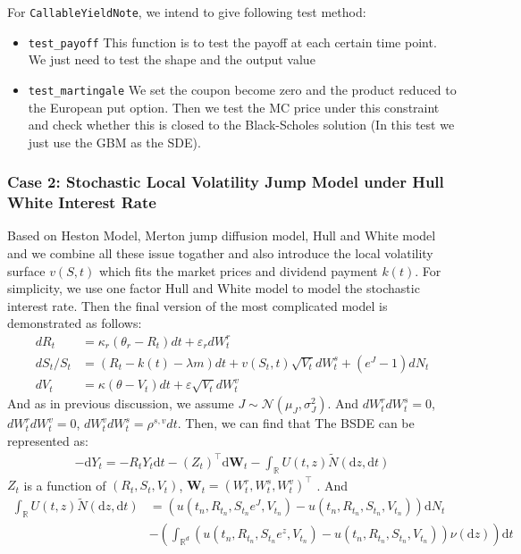 \documentclass[11pt,a4paper]{article}
\theoremstyle{remark}
\begin{document}
For \texttt{CallableYieldNote}, we intend to give following test method:
\begin{itemize}
	\item  \texttt{test\_payoff} This function is to test the payoff at each certain time point. We just need to test the shape and the output value
	
	\item \texttt{test\_martingale} We set the coupon become zero and the product reduced to the European put option. Then we test the MC price under this constraint and check whether this is closed to the Black-Scholes solution (In this test we just use the GBM as the SDE).
\end{itemize}


\subsubsection{Case 2: Stochastic Local Volatility Jump Model under Hull White Interest Rate}
Based on Heston Model, Merton jump diffusion model, Hull and White model and we combine all these issue togather and also introduce the local volatility surface $v(S, t)$ which fits the market prices and dividend payment $k(t)$. For simplicity, we use one factor Hull and White model to model the stochastic interest rate.  Then the final version of the most complicated model is demonstrated as follows:
\begin{align*}
	d R_t & = \kappa_r(\theta_r-R_t) d t+\varepsilon_r  d W^r_t\\
	d S_t/S_t & =(R_t - k(t) -\lambda m) d t + v(S_t, t)\sqrt{V_t}  d W^s_t + \left(e^J-1\right)  d N_t \\
	d V_t & =\kappa(\theta-V_t) d t+\varepsilon \sqrt{V_t} d W^v_t
\end{align*}
And as in previous discussion, we assume $J \sim \mathcal{N}(\mu_J, \sigma_J^2)$. And $d W^r_t dW^s_t = 0$, $d W^r_t dW^v_t = 0$, $d W^v_t dW^s_t = \rho^{s,v} dt$. Then, we can find that The BSDE can be represented as:
\begin{align*}
	-\mathrm{d}Y_t = -R_t Y_t \mathrm{d} t - (Z_t)^{\top}  \mathrm{d}\boldsymbol{W}_t- \int_{\mathbb{R}}U(t,z) \tilde{N}\left(\mathrm{d} z, \mathrm{d} t\right) 
\end{align*}
$Z_t$ is a function of $(R_t, S_t, V_t)$, $\boldsymbol{W}_t = (W^r_t, W^s_t, W^v_t)^{\top}$ . And
\begin{align*}
	\int_{\mathbb{R}}U(t,z) \tilde{N}\left(\mathrm{d} z, \mathrm{d} t\right)  &=  \left(u(t_n, R_{t_n}, S_{t_n}e^J, V_{t_n}) - u(t_n, R_{t_n}, S_{t_n}, V_{t_n})\right) \mathrm{d} N_t \\
	&- \left( \int_{\mathbb{R}^d}\left(u(t_n, R_{t_n}, S_{t_n}e^{z},  V_{t_n}) - u(t_n,R_{t_n},  S_{t_n}, V_{t_n})\right)\nu(\mathrm{d}z)\right) \mathrm{d}t
\end{align*}
\end{document}
